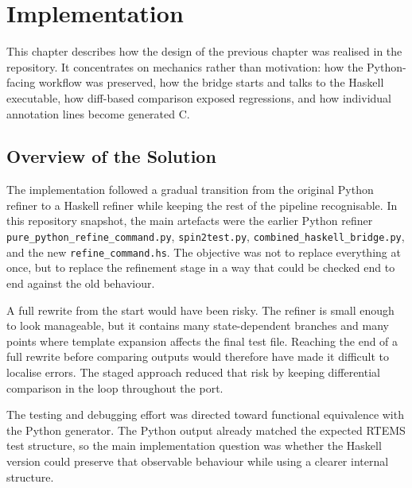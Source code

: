 \chapter{Implementation}
\label{chap:Implementation}
\lstset{language=Python}
\captionsetup{width=.8\linewidth}


This chapter describes how the design of the previous chapter was
realised in the repository. It concentrates on mechanics rather than
motivation: how the Python-facing workflow was preserved, how the
bridge starts and talks to the Haskell executable, how diff-based
comparison exposed regressions, and how individual annotation lines
become generated C.

\section{Overview of the Solution}


The implementation followed a gradual transition from the original
Python refiner to a Haskell refiner while keeping the rest of the
pipeline recognisable. In this repository snapshot, the main artefacts
were the earlier Python refiner
\texttt{pure\_python\_refine\_command.py}, \texttt{spin2test.py},
\texttt{combined\_haskell\_bridge.py}, and the new
\texttt{refine\_command.hs}. The objective was not to replace
everything at once, but to replace the refinement stage in a way that
could be checked end to end against the old behaviour.

A full rewrite from the start would have been risky. The refiner is
small enough to look manageable, but it contains many state-dependent
branches and many points where template expansion affects the final
test file. Reaching the end of a full rewrite before comparing outputs
would therefore have made it difficult to localise errors. The staged
approach reduced that risk by keeping differential comparison in the
loop throughout the port.

The testing and debugging effort was directed toward functional
equivalence with the Python generator. The Python output already
matched the expected RTEMS test structure, so the main implementation
question was whether the Haskell version could preserve that
observable behaviour while using a clearer internal structure.

